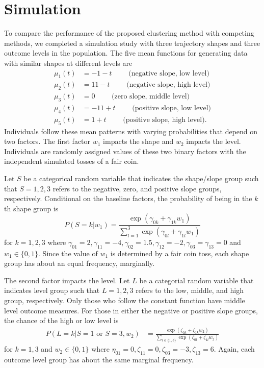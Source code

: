 \documentclass[12pt]{article}
\begin{document}
\section{Simulation}
To compare the performance of the proposed clustering method with competing methods, we completed a simulation study with three trajectory shapes and three outcome levels in the population. The five mean functions for generating data with similar shapes at different levels are  
\begin{align*}
\mu_{1}(t) &= -1 - t \quad\quad\text{ (negative slope, low level)}\\
\mu_{2}(t) &= 11 - t\quad\quad\text{ (negative slope, high level)}\\
\mu_{3}(t) &= 0\quad\quad\text{ (zero slope, middle level)}\\
\mu_{4}(t) &= -11 + t\quad\quad\text{ (positive slope, low level)}\\
\mu_{5}(t) &= 1 + t\quad\quad\text{ (positive slope, high level)}.
\end{align*} 
Individuals follow these mean patterns with varying probabilities that depend on two factors. The first factor $w_{1}$ impacts the shape and $w_{2}$ impacts the level. Individuals are randomly assigned values of these two binary factors with the independent simulated tosses of a fair coin. 

Let $S$ be a categorical random variable that indicates the shape/slope group such that $S=1,2,3$ refers to the negative, zero, and positive slope groups, respectively. Conditional on the baseline factors, the probability of being in the $k$th shape group is
$$P(S=k |w_{1}) = \frac{\exp(\gamma_{0k}+\gamma_{1k}w_{1})}{\sum^{3}_{l=1} \exp(\gamma_{0l}+\gamma_{1l}w_{1})}$$
for $k=1,2,3$ where $\gamma_{01}=2,\gamma_{11} = -4,\gamma_{02}=1.5,\gamma_{12}=-2,\gamma_{03}=\gamma_{13} = 0$ and $w_{1}\in\{0,1\}$. Since the value of $w_{1}$ is determined by a fair coin toss, each shape group has about an equal frequency, marginally. 

The second factor impacts the level. Let $L$ be a categorial random variable that indicates level group such that $L=1,2,3$ refers to the low, middle, and high group, respectively. Only those who follow the constant function have middle level outcome measures. For those in either the negative or positive slope groups, the chance of the high or low level is
\begin{align*}
P(L=k|S=1 \text{ or } S=3,w_{2}) & = \frac{\exp(\zeta_{0k}+\zeta_{1k} w_{2})}{\sum_{l\in\{1,3\} }\exp(\zeta_{0l}+\zeta_{1l}w_{2})}
\end{align*}
for $k=1,3$ and $w_{2}\in\{0,1\}$ where $\eta_{01}=0,\zeta_{11}=0,\zeta_{03}=-3,\zeta_{13}=6$. Again, each outcome level group has about the same marginal frequency.
\end{document}
